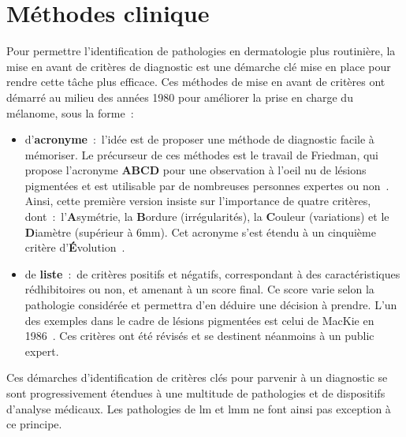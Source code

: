 \section{Méthodes clinique}
\label{sec:clinical_methods}
Pour permettre l'identification de pathologies en dermatologie plus routinière, la mise en avant de critères de diagnostic est une démarche clé mise en place pour rendre cette tâche plus efficace. Ces méthodes de mise en avant de critères ont démarré au milieu des années 1980 pour améliorer la prise en charge du mélanome, sous la forme~:
\begin{itemize}
    \item d'\textbf{acronyme}~:~l'idée est de proposer une méthode de diagnostic facile à mémoriser. Le précurseur de ces méthodes est le travail de Friedman, qui propose l'acronyme \textbf{ABCD} pour une observation à l'oeil nu de lésions pigmentées et est utilisable par de nombreuses personnes expertes ou non~\cite{Friedman1985}. Ainsi, cette première version insiste sur l'importance de quatre critères, dont~:~l'\textbf{A}symétrie, la \textbf{B}ordure (irrégularités), la \textbf{C}ouleur (variations) et le \textbf{D}iamètre (supérieur à 6mm). Cet acronyme s'est étendu à un cinquième critère d'\textbf{É}volution~\cite{Abbasi2004}.
    \item de \textbf{liste}~:~de critères positifs et négatifs, correspondant à des caractéristiques rédhibitoires ou non, et amenant à un score final. Ce score varie selon la pathologie considérée et permettra d'en déduire une décision à prendre. L'un des exemples dans le cadre de lésions pigmentées est celui de MacKie en 1986~\cite{mackie1986}. Ces critères ont été révisés et se destinent néanmoins à un public expert.
\end{itemize}\par

Ces démarches d'identification de critères clés pour parvenir à un diagnostic se sont progressivement étendues à une multitude de pathologies et de dispositifs d'analyse médicaux. Les pathologies de \gls{lm} et \gls{lmm} ne font ainsi pas exception à ce principe.\par

